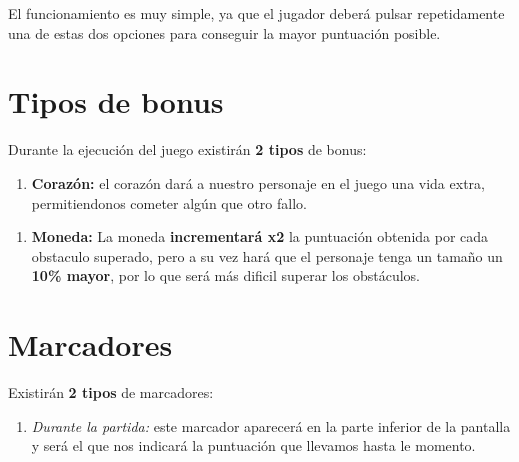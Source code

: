 \documentclass[12zpt]{article}
\begin{document}
El funcionamiento es muy simple, ya que el jugador deberá pulsar repetidamente una de estas dos opciones para conseguir la mayor puntuación posible.


\section{Tipos de bonus}
Durante la ejecución del juego existirán \textbf{2 tipos} de bonus:

\begin{enumerate}
	\item \textbf{Corazón:} el corazón dará a nuestro personaje en el juego una vida extra, permitiendonos cometer algún que otro fallo.
\end{enumerate}
\noindent{} 

\begin{enumerate}
	\item \textbf{Moneda:} La moneda \textbf{incrementará x2} la puntuación obtenida por cada obstaculo superado, pero a su vez hará que el personaje
	tenga un tamaño un \textbf{10\% mayor}, por lo que será más dificil superar los obstáculos.
\end{enumerate}
\noindent{}


\section{Marcadores}

Existirán \textbf{2 tipos} de marcadores:

\begin{enumerate}
	\item \textit{Durante la partida:} este marcador aparecerá en la parte inferior de la pantalla y será el que nos indicará la puntuación que llevamos hasta le momento.
\end{enumerate}
\noindent{}
\end{document}
